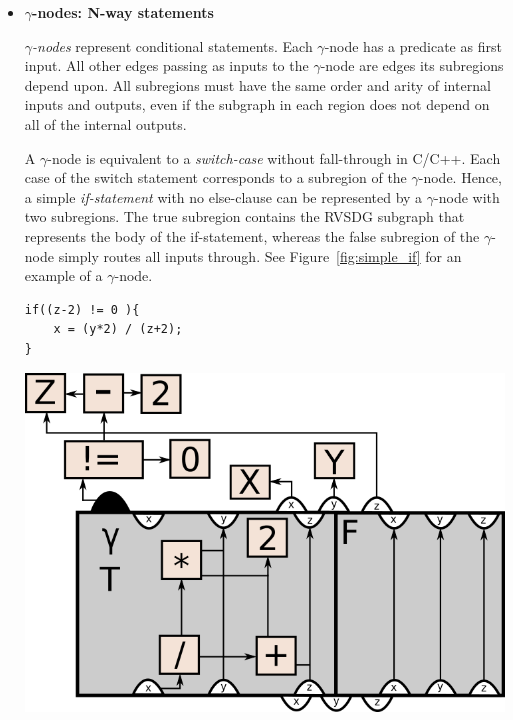 \begin{itemize}

\item \textbf{$\gamma$-nodes: N-way statements}

\textit{$\gamma$-nodes} represent conditional statements. Each $\gamma$-node has
a predicate as first input. All other edges passing as inputs to the
$\gamma$-node are edges its subregions depend upon. All subregions must have the
same order and arity of internal inputs and outputs, even if the subgraph in
each region does not depend on all of the internal outputs.

A $\gamma$-node is equivalent to a \textit{switch-case} without fall-through in
C/C++. Each case of the switch statement corresponds to a subregion of the
$\gamma$-node. Hence, a simple \textit{if-statement} with no else-clause can be
represented by a $\gamma$-node with two subregions. The true subregion contains
the RVSDG subgraph that represents the body of the if-statement, whereas the
false subregion of the $\gamma$-node simply routes all inputs through. See
Figure~\ref{fig:simple_if} for an example of a $\gamma$-node.

\begin{centering}
	\noindent\begin{minipage}{0.36\textwidth}
		\begin{CenteredBox}
		\begin{lstlisting}[label={lst:simple_if}, style=minipage_customcpp,
basicstyle=\fontsize{10}{1}]
if((z-2) != 0 ){
	x = (y*2) / (z+2);
}
		\end{lstlisting}
		\end{CenteredBox}
	\end{minipage}
	\noindent\begin{minipage}{0.55\textwidth}
		\captionsetup{type=figure}
		\includegraphics[width=\textwidth]{figures/simple_if_example}
	\end{minipage}
	\label{fig:simple_if}
\end{centering}


\end{itemize}
